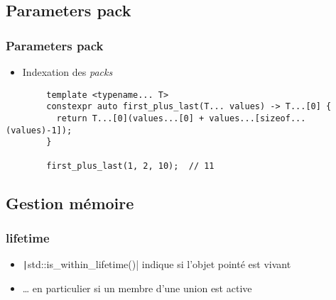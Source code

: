 \documentclass[C++.tex]{subfiles}
\begin{document}
\subsection*{Parameters pack}
\begin{frame}[fragile]
	\frametitle{Parameters pack}
	\begin{itemize}
		\item Indexation des \textit{packs}
	\end{itemize}

	\begin{verbatim}
		template <typename... T>
		constexpr auto first_plus_last(T... values) -> T...[0] {
		  return T...[0](values...[0] + values...[sizeof...(values)-1]);
		}

		first_plus_last(1, 2, 10);  // 11
	\end{verbatim}


\end{frame}

\subsection*{Gestion mémoire}
\begin{frame}[fragile]
	\frametitle{lifetime}
	\begin{itemize}
		\item \texttt|std::is_within_lifetime()| indique si l'objet pointé est vivant
		\item \ldots{} en particulier si un membre d'une union est active
	\end{itemize}

\end{frame}
\end{document}
